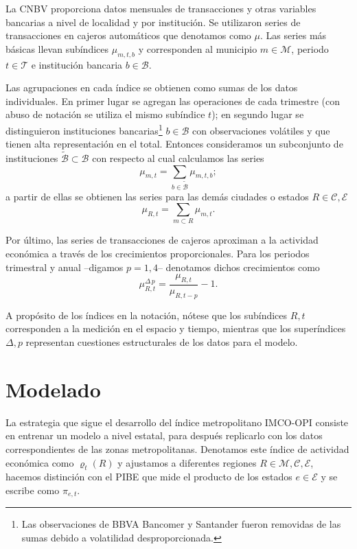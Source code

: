 \documentclass[]{article}
\let\rmarkdownfootnote\footnote%
\def\footnote{\protect\rmarkdownfootnote}
\begin{document}
La CNBV proporciona datos mensuales de transacciones y otras variables
bancarias a nivel de localidad y por institución. Se utilizaron series
de transacciones en cajeros automáticos que denotamos como \(\mu\). Las
series más básicas llevan subíndices \(\mu_{m,t,b}\) y corresponden al
municipio \(m \in \mathcal{M}\), periodo \(t \in \mathcal{T}\) e
institución bancaria \(b \in \mathcal{B}\).

Las agrupaciones en cada índice se obtienen como sumas de los datos
individuales. En primer lugar se agregan las operaciones de cada
trimestre (con abuso de notación se utiliza el mismo subíndice \(t\));
en segundo lugar se distinguieron instituciones bancarias\footnote{Las
  observaciones de BBVA Bancomer y Santander fueron removidas de las
  sumas debido a volatilidad desproporcionada.} \(b \in \mathcal{B}\)
con observaciones volátiles y que tienen alta representación en el
total. Entonces consideramos un subconjunto de instituciones
\(\tilde{\mathcal{B}} \subset \mathcal{B}\) con respecto al cual
calculamos las series
\[ \mu_{m,t} = \sum_{b \in \tilde{\mathcal{B}}} \mu_{m,t,b}; \] a partir
de ellas se obtienen las series para las demás ciudades o estados
\(R \in \mathcal{C, E}\) \[ \mu_{R,t} = \sum_{m \subset R}\mu_{m,t}.\]

Por último, las series de transacciones de cajeros aproximan a la
actividad económica a través de los crecimientos proporcionales. Para
los periodos trimestral y anual --digamos \(p = 1,4\)-- denotamos dichos
crecimientos como\\
\[ \mu_{R,t}^{\Delta\,p} = \frac{\mu_{R,t}}{\mu_{R,t-p}} - 1.\]

A propósito de los índices en la notación, nótese que los subíndices
\(R,t\) corresponden a la medición en el espacio y tiempo, mientras que
los superíndices \(\Delta, p\) representan cuestiones estructurales de
los datos para el modelo.

\section{Modelado}\label{modelado}

La estrategia que sigue el desarrollo del índice metropolitano IMCO-OPI
consiste en entrenar un modelo a nivel estatal, para después replicarlo
con los datos correspondientes de las zonas metropolitanas. Denotamos
este índice de actividad económica como \(\varrho_{t}(R)\) y ajustamos a
diferentes regiones \(R \in \mathcal M, \mathcal{C}, \mathcal E\),
hacemos distinción con el PIBE que mide el producto de los estados
\(e \in \mathcal E\) y se escribe como \(\pi_{e,t}\).
\end{document}
